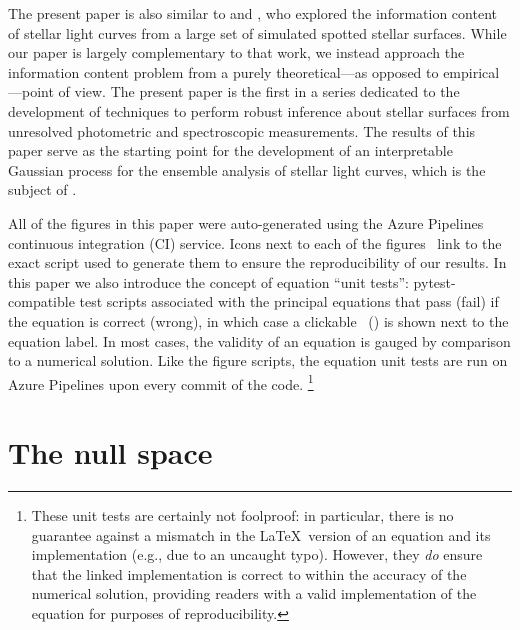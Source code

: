 \documentclass[modern]{aastex62}
\begin{document}
The present paper is also similar to \citet{Walkowicz2013} and
\citet{Basri2020}, who explored the information content of
stellar light curves from a large set of simulated spotted stellar
surfaces. While our paper is largely complementary to
that work, we instead approach the information content problem from
a purely theoretical---as opposed to empirical---point of view.
%
The present paper is the first in a series dedicated to the development of
techniques to perform robust inference about stellar surfaces from
unresolved photometric and spectroscopic measurements. The results
of this paper serve as the starting point for the development of
an interpretable Gaussian process for the ensemble analysis of
stellar light curves, which is the subject of
.

\vspace{1em}

All of the figures in this paper were auto-generated
using the Azure Pipelines continuous integration (CI) service.
Icons next to each of the figures \codeicon \,
link to the exact script used to generate them to ensure the reproducibility
of our results. In this paper we also introduce the concept of equation
``unit tests'': \textsf{pytest}-compatible test scripts associated
with the principal equations that pass (fail) if the equation is correct (wrong),
in which case a clickable \testpassicon \, (\testfailicon) is shown next to the equation
label.
In most cases, the validity of an equation is gauged by comparison to
a numerical solution. Like the figure scripts, the equation unit tests are
run on Azure Pipelines upon every commit of the code.%
\footnote{
    These unit tests are certainly not foolproof: in particular, there is
    no guarantee against a mismatch in the \LaTeX \, version of an equation
    and its \Python implementation (e.g., due to an uncaught typo). However, they
    \emph{do} ensure that the linked \Python implementation is correct to
    within the accuracy of the numerical solution, providing readers with a
    valid implementation of the equation for purposes of reproducibility.
}

\section{The null space}
\label{sec:nullspace}
\end{document}
